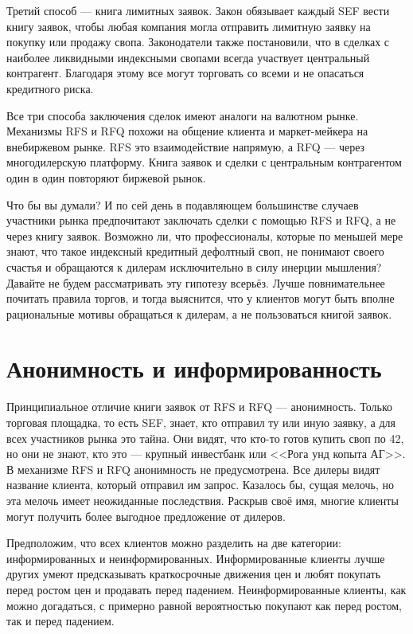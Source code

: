 Третий способ --- книга лимитных заявок. Закон обязывает каждый SEF вести книгу
заявок, чтобы любая компания могла отправить лимитную заявку на покупку или
продажу свопа. Законодатели также постановили, что в сделках с наиболее
ликвидными индексными свопами всегда участвует центральный контрагент. Благодаря
этому все могут торговать со всеми и не опасаться кредитного риска.

Все три способа заключения сделок имеют аналоги на валютном рынке. Механизмы RFS
и RFQ похожи на общение клиента и маркет-мейкера на внебиржевом рынке. RFS это
взаимодействие напрямую, а RFQ --- через многодилерскую платформу. Книга заявок
и сделки с центральным контрагентом один в один повторяют биржевой рынок.

Что бы вы думали? И по сей день в подавляющем большинстве случаев участники
рынка предпочитают заключать сделки с помощью RFS и RFQ, а не через книгу
заявок. Возможно ли, что профессионалы, которые по меньшей мере знают, что такое
индексный кредитный дефолтный своп, не понимают своего счастья и обращаются к
дилерам исключительно в силу инерции мышления? Давайте не будем рассматривать
эту гипотезу всерьёз. Лучше повнимательнее почитать правила торгов, и тогда
выяснится, что у клиентов могут быть вполне рациональные мотивы обращаться к
дилерам, а не пользоваться книгой заявок.

\section*{Анонимность и информированность}

Принципиальное отличие книги заявок от RFS и RFQ --- анонимность. Только
торговая площадка, то есть SEF, знает, кто отправил ту или иную заявку, а для
всех участников рынка это тайна. Они видят, что кто-то готов купить своп по 42,
но они не знают, кто это --- крупный инвестбанк или <<Рога унд копыта АГ>>. В
механизме RFS и RFQ анонимность не предусмотрена. Все дилеры видят название
клиента, который отправил им запрос. Казалось бы, сущая мелочь, но эта мелочь
имеет неожиданные последствия. Раскрыв своё имя, многие клиенты могут получить
более выгодное предложение от дилеров.

Предположим, что всех клиентов можно разделить на две категории: информированных
и неинформированных. Информированные клиенты лучше других умеют предсказывать
краткосрочные движения цен и любят покупать перед ростом цен и продавать перед
падением. Неинформированные клиенты, как можно догадаться, с примерно равной
вероятностью покупают как перед ростом, так и перед падением.


